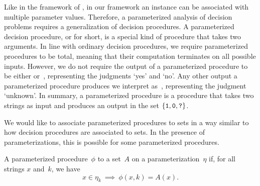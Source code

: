 Like in the framework of \textcite{downey1999parameterized}, in our framework an instance can be associated with multiple parameter values.
Therefore, a parameterized analysis of decision problems requires a generalization of decision procedures.
A parameterized decision procedure, or  for short, is a special kind of procedure that takes two arguments.
In line with ordinary decision procedures, we require parameterized procedures to be total, meaning that their computation terminates on all possible inputs.
However, we do not require the output of a parameterized procedure to be either  or~, representing the judgments `yes' and `no'.
Any other output a parameterized procedure produces we interpret as~, representing the judgment `unknown'.
In summary, a parameterized procedure is a procedure that takes two strings as input and produces an output in the set $\{\textnormal{\texttt{1}}, \textnormal{\texttt{0}}, \textnormal{\texttt{?}}\}$.

We would like to associate parameterized procedures to sets in a way similar to how decision procedures are associated to sets.
In the presence of parameterizations, this is possible for some parameterized procedures.
\begin{definition}
  A parameterized procedure~$\phi$  to a set~$A$ on a parameterization~$\eta$ if, for all strings $x$ and~$k$, we have
  \begin{equation*}
    x \in \eta_k \:\implies\: \phi(x, k) = A(x).
  \end{equation*}
\end{definition}

